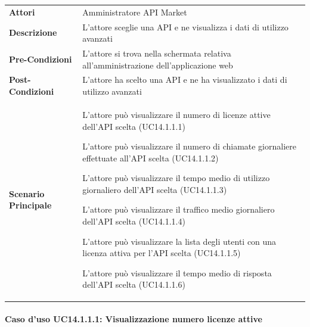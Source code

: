 \begin{minipage}{\linewidth}
	\begin{tabular}{ l | p{11cm}}
		\hline
		\rowcolor{Gray}
		\multicolumn{2}{c}{UC14.1.1.1 - Visualizzazione dati di utilizzo avanzati} \\
		\hline
		\textbf{Attori} &  Amministratore API Market \\
		\textbf{Descrizione} & L'attore sceglie una API e ne visualizza i dati di utilizzo avanzati \\
		\textbf{Pre-Condizioni} & L'attore si trova nella schermata relativa all'amministrazione dell'applicazione web \\
		\textbf{Post-Condizioni} & L'attore ha scelto una API e ne ha visualizzato i dati di utilizzo avanzati \\
		\textbf{Scenario Principale} & 
		\begin{enumerate*}[label=(\arabic*.),itemjoin={\newline}]
			\item L'attore può visualizzare il numero di licenze attive dell'API scelta (UC14.1.1.1)
			\item L'attore può visualizzare il numero di chiamate giornaliere effettuate all'API scelta (UC14.1.1.2)
			\item L'attore può visualizzare il tempo medio di utilizzo giornaliero dell'API scelta (UC14.1.1.3)
			\item L'attore può visualizzare il traffico medio giornaliero dell'API scelta (UC14.1.1.4)
			\item L'attore può visualizzare la lista degli utenti con una licenza attiva per l'API scelta (UC14.1.1.5)
			\item L'attore può visualizzare il tempo medio di risposta dell'API scelta (UC14.1.1.6)
		\end{enumerate*}\\
	\end{tabular}
\end{minipage}

\paragraph{Caso d'uso UC14.1.1.1: Visualizzazione numero licenze attive}
\label{UC14_1_1_1}

